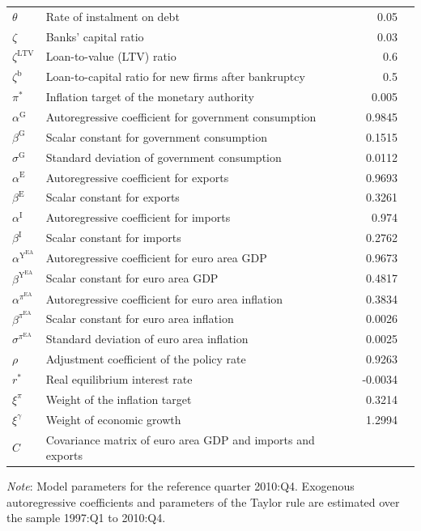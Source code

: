 \begin{table}[!htbp]
{\begin{tabular}{llrl}
			$\theta$ & Rate of instalment on debt & 0.05 & \\ 
			$\zeta$ & Banks' capital ratio & 0.03 & \\ 
			$\zeta^{\mathrm{LTV}}$ & Loan-to-value (LTV) ratio & 0.6 & \\ 
			$\zeta^{\mathrm{b}}$ & Loan-to-capital ratio for new firms after bankruptcy & 0.5 & \\ 
			$\pi^{*}$ & Inflation target of the monetary authority & 0.005 & \\ 
			\midrule
			$\alpha^{\mathrm{G}}$ & Autoregressive coefficient for government consumption & 0.9845 & \multirow{14}{*}{\rotatebox[origin=c]{90}{\parbox[c]{5.5cm}{\centering national accounts\\ (exogenously estimated)}}} \\ 
			$\beta^{\mathrm{G}}$ & Scalar constant for government consumption & 0.1515 & \\ 
			$\sigma^{\mathrm{G}}$ & Standard deviation of government consumption & 0.0112 & \\ 
			$\alpha^{\mathrm{E}}$ & Autoregressive coefficient for exports & 0.9693 & \\ 
			$\beta^{\mathrm{E}}$ & Scalar constant for exports & 0.3261 & \\ 
			$\alpha^{\mathrm{I}}$ & Autoregressive coefficient for imports & 0.974 & \\ 
			$\beta^{\mathrm{I}}$ & Scalar constant for imports & 0.2762 & \\ 
			$\alpha^{\mathrm{Y}^{\mathrm{EA}}}$ & Autoregressive coefficient for euro area GDP & 0.9673 & \\ 
			$\beta^{\mathrm{Y}^{\mathrm{EA}}}$ & Scalar constant for euro area GDP & 0.4817 & \\ 
			$\alpha^{\pi^{\mathrm{EA}}}$ & Autoregressive coefficient for euro area inflation & 0.3834 & \\ 
			$\beta^{\pi^{\mathrm{EA}}}$ & Scalar constant for euro area inflation & 0.0026 & \\ 
			$\sigma^{\pi^{\mathrm{EA}}}$ & Standard deviation of euro area inflation & 0.0025 & \\ 
			$\rho$ & Adjustment coefficient of the policy rate & 0.9263 & \\ 
			$r^{*}$ & Real equilibrium interest rate & -0.0034 & \\ 
			$\xi^{\pi}$ & Weight of the inflation target & 0.3214 & \\ 
			$\xi^{\gamma}$ & Weight of economic growth & 1.2994 & \\
			$C$ & Covariance matrix of euro area GDP and imports and exports & & \\ 
			\bottomrule
		\end{tabular}
	}
	\begin{tablenotes}
		\footnotesize \item \textit{Note}: Model parameters for the reference quarter 2010:Q4. Exogenous autoregressive coefficients and parameters of the Taylor rule are estimated over the sample 1997:Q1 to 2010:Q4.
	\end{tablenotes}
\end{table}